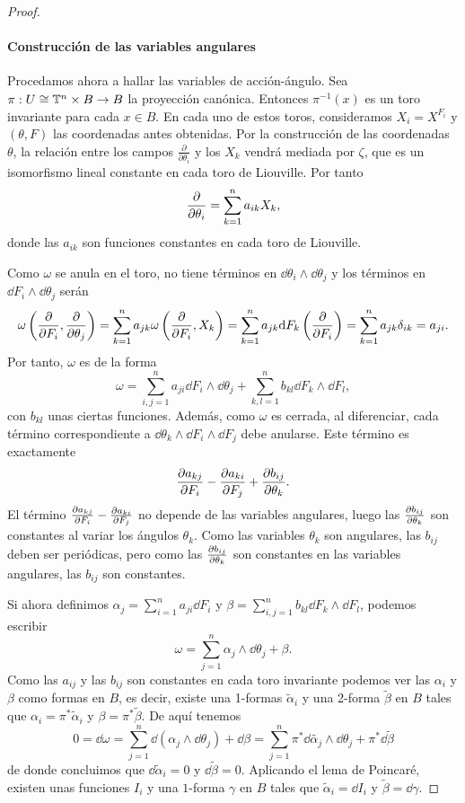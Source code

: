 \begin{proof}
  \paragraph{Construcción de las variables angulares}\leavevmode

 Procedamos ahora a hallar las variables de acción-ángulo. Sea $\pi:U\cong \mathbb{T}^n \times B \rightarrow B$ la proyección canónica. Entonces $\pi^{-1}(x)$ es un toro invariante para cada $x \in B$. 
 En cada uno de estos toros, consideramos $X_i=X^{F_i}$ y $(\theta,F)$ las coordenadas antes obtenidas.
 Por la construcción de las coordenadas $\theta$, la relación entre los campos $\frac{\partial}{\partial \theta_i}$ y los $X_k$ vendrá mediada por $\zeta$, que es un isomorfismo lineal constante en cada toro de Liouville. Por tanto
 \begin{equation*}
   \frac{\partial}{\partial \theta_i}=\sum_{k=1}^n a_{ik}X_k,
 \end{equation*}
 donde las $a_{ik}$ son funciones constantes en cada toro de Liouville.

Como $\omega$ se anula en el toro, no tiene términos en $\dd \theta_i \wedge \dd \theta_j$ y los términos en $\dd F_i \wedge \dd \theta_j$ serán
\[
  \omega\left(\frac{\partial}{\partial F_i},\frac{\partial}{\partial \theta_j}\right)=\sum_{k=1}^n a_{jk} \omega\left(\frac{\partial}{\partial F_i},X_k\right)=\sum_{k=1}^n a_{jk}\mathrm{d} F_k\left(\frac{\partial}{\partial F_i}\right)=\sum_{k=1}^na_{jk} \delta_{ik}=a_{ji}.
\]
Por tanto, $\omega$ es de la forma
\[
  \omega = \sum_{i,j=1}^n a_{ji} \dd F_i \wedge \dd \theta_j + \sum_{k,l=1}^n b_{kl} \dd F_k \wedge \dd F_l,
\]
con $b_{kl}$ unas ciertas funciones. Además, como $\omega$ es cerrada, al diferenciar, cada término correspondiente a $\dd \theta_k \wedge \dd F_i \wedge \dd F_j$ debe anularse. Este término es exactamente
$$\frac{\partial a_{kj}}{\partial F_i}-\frac{\partial a_{ki}}{\partial F_j}+\frac{\partial b_{ij}}{\partial \theta_k}.$$
El término $\frac{\partial a_{kj}}{\partial F_i}-\frac{\partial a_{ki}}{\partial F_j}$ no depende de las variables angulares, luego las $\frac{\partial b_{ij}}{\partial \theta_k}$ son constantes al variar los ángulos $\theta_k$. Como las variables $\theta_k$ son angulares, las $b_{ij}$ deben ser periódicas, pero como las $\frac{\partial b_{ij}}{\partial \theta_k}$ son constantes en las variables angulares, las $b_{ij}$ son constantes.

Si ahora definimos $\alpha_j=\sum_{i=1}^n a_{ji}\dd F_i$ y $\beta= \sum_{i,j=1}^n b_{kl} \dd F_k \wedge \dd F_l$, podemos escribir
\[
  \omega=\sum_{j=1}^n \alpha_j \wedge \dd \theta_j  + \beta.
\]
Como las $a_{ij}$ y las $b_{ij}$ son constantes en cada toro invariante podemos ver las $\alpha_i$ y $\beta$ como formas en $B$, es decir, existe una 1-formas $\tilde{\alpha}_i$ y una 2-forma $\tilde{\beta}$ en $B$ tales que
$\alpha_i=\pi^* \tilde{\alpha}_i$ y $\beta=\pi^* \tilde{\beta}$.
De aquí tenemos
\[
  0=\dd \omega= \sum_{j=1}^n \dd (\alpha_j \wedge \dd \theta_j) + \dd \beta= \sum_{j=1}^n \pi^* \dd \tilde{\alpha_j} \wedge \dd \theta_j + \pi^* \dd \tilde{\beta}
\]
de donde concluimos que $\dd \tilde{\alpha}_i =0$ y $\dd \tilde{\beta} =0$. Aplicando el lema de Poincaré, existen unas funciones $I_i$ y una $1$-forma $\gamma$ en $B$ tales que $\tilde{\alpha}_i=\dd I_i$ y $\tilde{\beta}= \dd \gamma$.


\end{proof}

